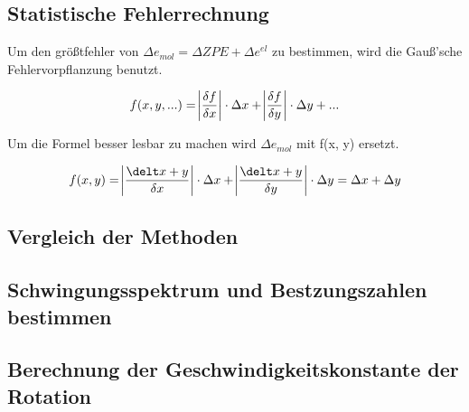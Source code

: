 \subsection{Statistische Fehlerrechnung}

Um den größtfehler von $\Delta e_{mol} = \Delta ZPE + \Delta e^{el} $ zu bestimmen, wird die Gauß'sche Fehlervorpflanzung benutzt.

\begin{align}
    f(x, y, ...) = \abs{\frac{\delta f}{\delta x}} \cdot \Delta x + \abs{\frac{\delta f}{\delta y}} \cdot \Delta y + ...
\end{align}

Um die Formel besser lesbar zu machen wird $\Delta e_{mol}$ mit f(x, y) ersetzt.

\begin{align*}
    f(x, y) = \abs{\frac{\delt x+y}{\delta x}} \cdot \Delta x + \abs{\frac{\delt x+y}{\delta y}} \cdot \Delta y = \Delta x + \Delta y
\end{align*}

\subsection{Vergleich der Methoden}

\subsection{Schwingungsspektrum und Bestzungszahlen bestimmen}

\subsection{Berechnung der Geschwindigkeitskonstante der Rotation}
